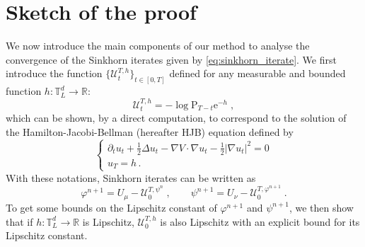 \documentclass[final,12pt]{colt2023} %
\def\rset{\mathbb{R}}
\newcommand{\rmP}{\mathrm{P}}
\newcommand{\rme}{\mathrm{e}}
\def\torus{\tset}
\def\torusL{\torus_L}
\def\rset{\mathbb{R}}
\def\tset{\mathbb{T}}
\def\eqsp{\;}
\begin{document}
  


  
  \section{Sketch of the proof}\label{sec:proof}


  We now introduce the main components of our method to analyse the convergence of the Sinkhorn iterates given by \eqref{eq:sinkhorn_iterate}.
  We first introduce the function $\{\mathcal{U}^{T,h}_t\}_{t \in [0,T]}$ defined for any measurable and bounded function $h: \torusL^d \to \rset$:
  \begin{equation}
    \label{eq:def_value_function_exp}
    \mathcal{U}^{T,h}_t = - \log \rmP_{T-t} \rme^{-h} \eqsp,
  \end{equation}
which can be shown, by a direct computation, to correspond to the solution of the Hamilton-Jacobi-Bellman (hereafter HJB) equation defined by
\begin{equation}\label{HJB}
\begin{cases}
\partial_t u_t+\frac12\Delta u_t-\nabla V\cdot\nabla u_t-\frac12 |\nabla u_t|^2=0\\
u_T=h\, .
\end{cases}
\end{equation}
With these notations,
Sinkhorn iterates can be written as
\begin{equation}
    \label{eq:sinkhorn_iterates}
\varphi^{n+1}= U_{\mu}-\mathcal{U}^{T,\psi^n}_0\eqsp, \qquad \psi^{n+1} = U_{\nu}-\mathcal{U}^{T,\varphi^{n+1}}_0 \eqsp.
\end{equation}
To get some bounds on the Lipschitz constant of $\varphi^{n+1}$ and $\psi^{n+1}$, we then show that if $h: \torusL^d \to \rset$ is Lipschitz, $\mathcal{U}^{T,h}_0$ is also Lipschitz with an explicit bound for its Lipschitz constant.   
\end{document}
